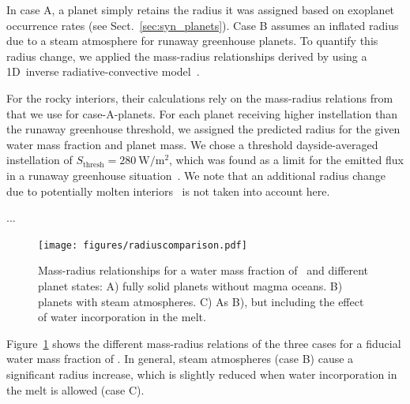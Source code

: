 \documentclass[modern]{aastex631}
\begin{document}
In case A, a planet simply retains the radius it was assigned based on exoplanet occurrence rates (see Sect.~\ref{sec:syn_planets}).
Case B assumes an inflated radius due to a steam atmosphere for runaway greenhouse planets.
To quantify this radius change, we applied the mass-radius relationships derived by \citet{Turbet2020} using a 1D~inverse radiative-convective model~\citep{Turbet2019}.
\begin{note}
For the rocky interiors, their calculations rely on the mass-radius relations from ~\citep{Zeng2016} that we use for case-A-planets.
For each planet receiving higher instellation than the runaway greenhouse threshold, we assigned the predicted radius for the given water mass fraction and planet mass.
We chose a threshold dayside-averaged instellation of $S_\mathrm{thresh} = \SI{280}{\watt\per\meter\squared}$, which was found as a limit for the emitted flux in a runaway greenhouse situation~\citep{Goldblatt2013,Leconte2013}.
We note that an additional radius change due to potentially molten interiors~\citep{Bower2019} is not taken into account here.
\end{note}
...


\begin{figure}
    \begin{centering}
        \texttt{[image: figures/radiuscomparison.pdf]}
        \caption{Mass-radius relationships for a water mass fraction of \wrr\ and different planet states: A) fully solid planets without magma oceans. B) planets with steam atmospheres. C) As B), but including the effect of water incorporation in the melt.}
        \label{fig:radiuscomparison}
    \end{centering}
\end{figure}

Figure~\ref{fig:radiuscomparison} shows the different mass-radius relations of the three cases for a fiducial water mass fraction of \wrr.
In general, steam atmospheres (case B) cause a significant radius increase, which is slightly reduced when water incorporation in the melt is allowed (case C).
\end{document}
